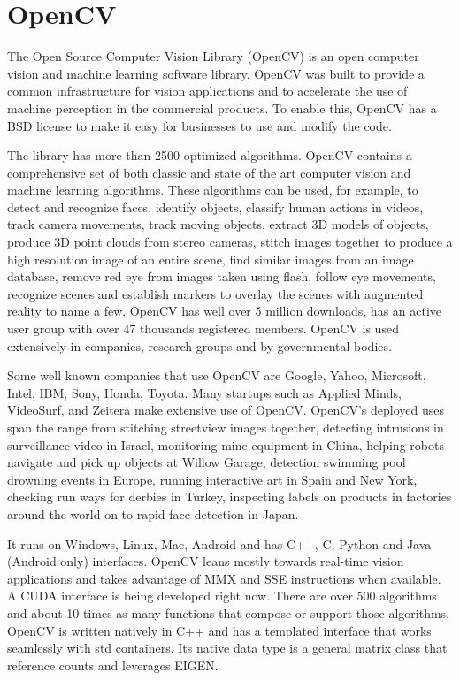 
\clearpage

\section{OpenCV}

The Open Source Computer Vision Library (OpenCV) is an open computer vision and machine learning software library. OpenCV was built to provide a common infrastructure for vision applications and to accelerate the use of machine perception in the commercial products. To enable this, OpenCV has a BSD license to make it easy for businesses to use and modify the code.

The library has more than 2500 optimized algorithms. OpenCV contains a comprehensive set of both classic and state of the art computer vision and machine learning algorithms. These algorithms can be used, for example, to detect and recognize faces, identify objects, classify human actions in videos, track camera movements, track moving objects, extract 3D models of objects, produce 3D point clouds from stereo cameras, stitch images together to produce a high resolution image of an entire scene, find similar images from an image database, remove red eye from images taken using flash, follow eye movements, recognize scenes and establish markers to overlay the scenes with augmented reality to name a few. OpenCV has well over 5 million downloads, has an active user group with over 47 thousands registered members. OpenCV is used extensively in companies, research groups and by governmental bodies.

Some well known companies that use OpenCV are Google, Yahoo, Microsoft, Intel, IBM, Sony, Honda, Toyota. Many startups such as Applied Minds, VideoSurf, and Zeitera make extensive use of OpenCV. OpenCV’s deployed uses span the range from stitching streetview images together, detecting intrusions in surveillance video in Israel, monitoring mine equipment in China, helping robots navigate and pick up objects at Willow Garage, detection swimming pool drowning events in Europe, running interactive art in Spain and New York, checking run ways for derbies in Turkey, inspecting labels on products in factories around the world on to rapid face detection in Japan.

It runs on Windows, Linux, Mac, Android and has C++, C, Python and Java (Android only) interfaces. OpenCV leans mostly towards real-time vision applications and takes advantage of MMX and SSE instructions when available. A CUDA interface is being developed right now. There are over 500 algorithms and about 10 times as many functions that compose or support those algorithms. OpenCV is written natively in C++ and has a templated interface that works seamlessly with std containers. Its native data type is a general matrix class that reference counts and leverages EIGEN.
\cite{willowgarage:opencv}


